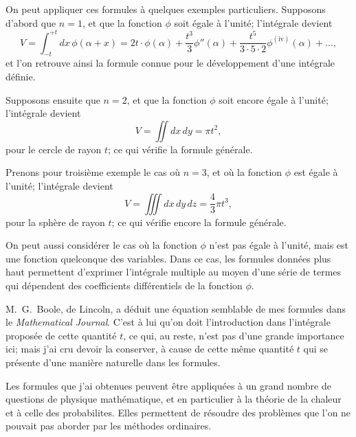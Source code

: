 \documentclass[11pt,a4paper]{book}
\begin{document}
\newpage
\setcounter{page}{202}

On peut appliquer ces formules \`{a} quelques exemples particuliers. Supposons
d'abord que $n=1$, et que la fonction $\phi$ soit \'{e}gale \`{a} l'unit\'{e}; l'int\'{e}grale devient
\[
V = \int_{-t}^{+t} dx \, \phi(\alpha + x) = 2t \cdot \phi(\alpha) + \frac{t^{3}}{3} \phi''(\alpha) + \frac{t^{5}}{3 \cdot 5 \cdot 2} \phi^{(\text{iv})}(\alpha) + \ldots,
\]
et l'on retrouve ainsi la formule connue pour le d\'{e}veloppement d'une int\'{e}grale d\'{e}finie.

Supposons ensuite que $n=2$, et que la fonction $\phi$ soit encore \'{e}gale \`{a} l'unit\'{e};
l'int\'{e}grale devient
\[
V = \iint dx \, dy = \pi t^{2},
\]
pour le cercle de rayon $t$; ce qui v\'{e}rifie la formule g\'{e}n\'{e}rale.

\newpage
\setcounter{page}{203}

Prenons pour troisi\`{e}me exemple le cas o\`{u} $n=3$, et o\`{u} la fonction $\phi$ est \'{e}gale \`{a}
l'unit\'{e}; l'int\'{e}grale devient
\[
V = \iiint dx \, dy \, dz = \frac{4}{3}\pi t^{3},
\]
pour la sph\`{e}re de rayon $t$; ce qui v\'{e}rifie encore la formule g\'{e}n\'{e}rale.

On peut aussi consid\'{e}rer le cas o\`{u} la fonction $\phi$ n'est pas \'{e}gale \`{a} l'unit\'{e}, mais
est une fonction quelconque des variables. Dans ce cas, les formules donn\'{e}es plus haut
permettent d'exprimer l'int\'{e}grale multiple au moyen d'une s\'{e}rie de termes qui d\'{e}pendent
des coefficients diff\'{e}rentiels de la fonction $\phi$.

\newpage
\setcounter{page}{204}

M.~G.~Boole, de Lincoln, a d\'{e}duit une \'{e}quation semblable de mes formules dans
le \textit{Mathematical Journal}. C'est \`{a} lui qu'on doit l'introduction dans l'int\'{e}grale propos\'{e}e
de cette quantit\'{e} $t$, ce qui, au reste, n'est pas d'une grande importance ici; mais j'ai
cru devoir la conserver, \`{a} cause de cette m\^{e}me quantit\'{e} $t$ qui se pr\'{e}sente d'une mani\`{e}re
naturelle dans les formules.

Les formules que j'ai obtenues peuvent \^{e}tre appliqu\'{e}es \`{a} un grand nombre de questions
de physique math\'{e}matique, et en particulier \`{a} la th\'{e}orie de la chaleur et \`{a} celle des
probabilites. Elles permettent de r\'{e}soudre des probl\`{e}mes que l'on ne pouvait pas
aborder par les m\'{e}thodes ordinaires.

\newpage
\setcounter{page}{205}
\end{document}

